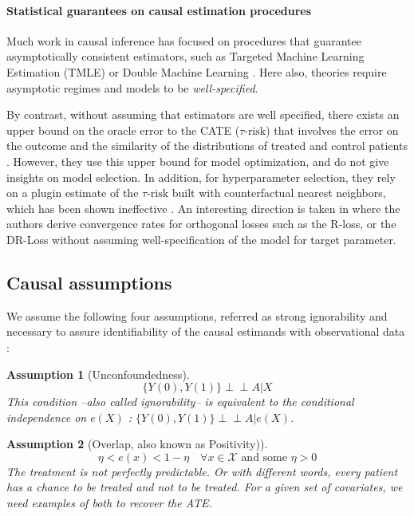 \documentclass[a4paper,num-refs]{oup-contemporary}%
\newtheorem{assumption}{Assumption}
\newcommand{\indep}{\perp \!\!\! \perp}
\begin{document}
\paragraph{Statistical guarantees on causal estimation procedures}

Much work in causal inference has focused on procedures that
guarantee asymptotically consistent estimators, such as Targeted
Machine Learning
Estimation (TMLE) \cite{laan_targeted_2011,schuler_targeted_2017} or
Double Machine Learning \cite{chernozhukov_double_2018}. Here also, theories require asymptotic regimes and
models to be \textit{well-specified}.

By contrast, without assuming that estimators are well specified, there exists an upper bound
on the oracle error to the CATE ($\tau\text{-risk}$) that involves the error on
the outcome and the similarity of the distributions of treated and control
patients \cite{johansson2022generalization}. However, they use this upper bound for model optimization,
and do not give insights on model selection. In addition, for hyperparameter
selection, they rely on a plugin estimate of the $\tau\text{-risk}$ built with
counterfactual nearest neighbors, which has been shown ineffective
\cite{schuler_comparison_2018}. An interesting direction is taken in \cite{foster2023orthogonal} where the authors derive convergence rates for orthogonal losses such as the R-loss, or the DR-Loss without assuming well-specification of the model for target parameter.


\subsection{Causal assumptions}\label{apd:causal_assumptions}

We assume the following four assumptions, referred as strong ignorability and
necessary to assure identifiability of the causal estimands with observational
data \cite{rubin_causal_2005}:
\begin{assumption}[Unconfoundedness]\label{assumption:ignorability}
    \begin{equation*}\label{eq:ignorability}
        \{Y(0), Y(1) \} \indep A | X
    \end{equation*}
    This condition --also called ignorability-- is equivalent to the conditional
    independence on $e(X)$ \cite{rosenbaum_central_1983}: $\{Y(0), Y(1) \}
        \indep  A | e(X)$.
\end{assumption}


\begin{assumption}[Overlap, also known as Positivity)]\label{assumption:overlap}
    \begin{equation*}\label{eq:overlap}
        \eta < e(x) < 1 - \eta \quad \forall x \in \mathcal X \text{ and some } \eta > 0
    \end{equation*}
    The treatment is not perfectly predictable. Or with different words, every
    patient has a chance to be treated and not to be treated. For a given set of
    covariates, we need examples of both to recover the ATE.
\end{assumption}
\end{document}
